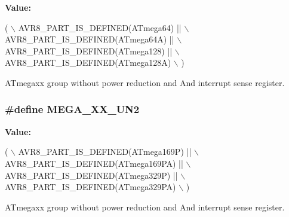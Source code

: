 {\bfseries Value\-:}
\begin{DoxyCode}
( \(\backslash\)
        AVR8\_PART\_IS\_DEFINED(ATmega64)    || \(\backslash\)
        AVR8\_PART\_IS\_DEFINED(ATmega64A)   || \(\backslash\)
        AVR8\_PART\_IS\_DEFINED(ATmega128)   || \(\backslash\)
        AVR8\_PART\_IS\_DEFINED(ATmega128A) \(\backslash\)
        )
\end{DoxyCode}
A\-Tmegaxx group without power reduction and And interrupt sense register. \hypertarget{group__mega__part__macros__group_ga5f4566d4ddaa3cee92d4c78162594f2d}{
\subsubsection[{M\-E\-G\-A\-\_\-\-X\-X\-\_\-\-U\-N2}]{\setlength{\rightskip}{0pt plus 5cm}\#define M\-E\-G\-A\-\_\-\-X\-X\-\_\-\-U\-N2}}\label{group__mega__part__macros__group_ga5f4566d4ddaa3cee92d4c78162594f2d}
{\bfseries Value\-:}
\begin{DoxyCode}
( \(\backslash\)
        AVR8\_PART\_IS\_DEFINED(ATmega169P)  || \(\backslash\)
        AVR8\_PART\_IS\_DEFINED(ATmega169PA) || \(\backslash\)
        AVR8\_PART\_IS\_DEFINED(ATmega329P)  || \(\backslash\)
        AVR8\_PART\_IS\_DEFINED(ATmega329PA) \(\backslash\)
        )
\end{DoxyCode}
A\-Tmegaxx group without power reduction and And interrupt sense register. 